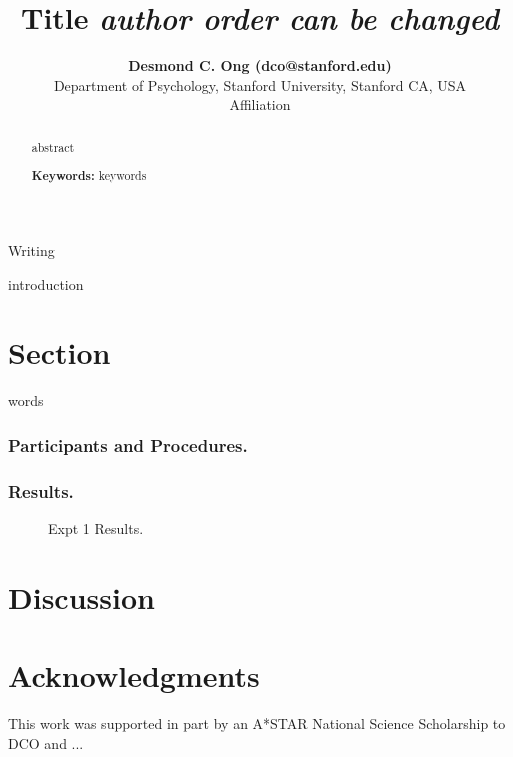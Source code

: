 \documentclass[10pt,letterpaper]{article}
\title{ Title \textit{author order can be changed} }
\author{{\large \bf Desmond C. Ong (dco@stanford.edu)} \\
  Department of Psychology, Stanford University, Stanford CA, USA 
  \And {\large \bf Carolyn Fu (...)} \\
  Affiliation
}
\begin{document}
\maketitle

\begin{abstract}
abstract

\textbf{Keywords:} 
keywords
\end{abstract}

Writing





introduction

\section{Section}

words


\subsubsection{Participants and Procedures.} 

\subsubsection{Results.} 

\begin{figure}[htb!]
\caption{ Expt 1 Results. }
\label{Expt1ResultFig}
\end{figure}



\begin{table}
\caption{Predictions for Experiment 2. }
\label{Expt2Predictions}
\end{table}


\section{Discussion}


\section{Acknowledgments}

This work was supported in part by an A*STAR National Science Scholarship to DCO and ...



\setlength{\bibleftmargin}{.125in}
\setlength{\bibindent}{-\bibleftmargin}


\end{document}
